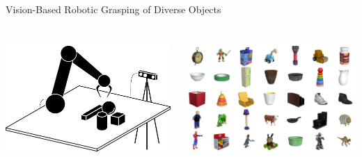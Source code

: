\begin{frame}{Vision-Based Robotic Grasping of Diverse Objects}{}
    \begin{columns}%
        \begin{column}{0.5\textwidth}%
            \centering
            \hspace{-0.5cm}
            \includegraphics[height=4.75cm]{graphics/setup_sketch.pdf}
        \end{column}
        \begin{column}{0.5\textwidth}%
            \centering
            \includegraphics[height=4.75cm]{graphics/training_set.png}
        \end{column}
    \end{columns}
\end{frame}

